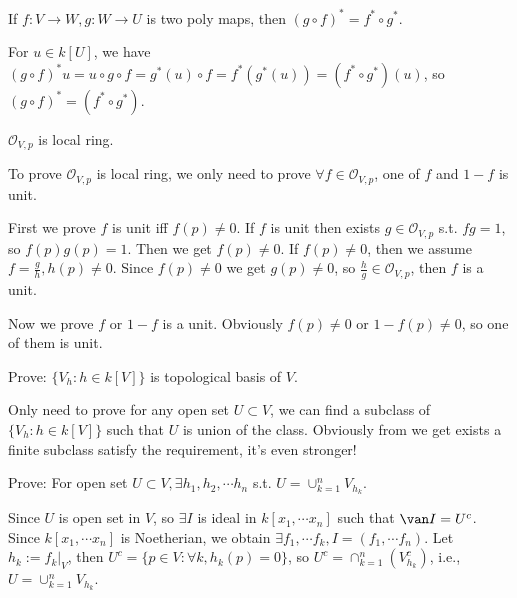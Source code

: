 \documentclass{ctexart}
\newif\ifpreface
\begin{document}
\large
\setlength{\baselineskip}{1.2em}
\ifpreface
    
\newgeometry{left=2cm,right=2cm,top=2cm,bottom=2cm}
\else
{}
\maketitle
\fi
\begin{problem}
 If $f:V\to W,g:W\to U$ is two poly maps, then $(g\circ f)^*=f^*\circ g^*$. 
\end{problem}

\begin{solution}
 For $u\in k[U]$, we have $(g\circ f)^* u=u\circ g\circ f=g^*(u)\circ f=f^*(g^*(u))=(f^*\circ g^*)(u)$, so $(g\circ f)^*=(f^*\circ g^*)$. 
\end{solution}

\begin{problem}
 $\mathcal{O}_{V,p}$ is local ring. 
\end{problem}

\begin{solution}
 To prove $\mathcal{O}_{V,p}$ is local ring, we only need to prove $\forall f\in \mathcal{O}_{V,p}$, one of $f$ and $1-f$ is unit. 

 First we prove $f$ is unit iff $f(p)\neq 0$. If $f$ is unit then exists $g\in \mathcal{O}_{V,p}$ s.t. $fg=1$, so $f(p)g(p)=1$. Then we get $f(p)\neq 0$. If $f(p)\neq 0$, then we assume $f=\frac{g}{h},h(p)\neq 0$. Since $f(p)\neq 0$ we get $g(p)\neq 0$, so $\frac{h}{g}\in \mathcal{O}_{V,p}$, then $f$ is a unit. 

 Now we prove $f$ or $1-f$ is a unit. Obviously $f(p)\neq 0$ or $1-f(p)\neq 0$, so one of them is unit. 
\end{solution}

\begin{problem}
 Prove: $\{V_h:h\in k[V]\}$ is topological basis of $V$. 
\end{problem}

\begin{solution}
 Only need to prove for any open set $U\subset V$, we can find a subclass of $\{V_h:h\in k[V]\}$ such that $U$ is union of the class. Obviously from  we get exists a finite subclass satisfy the requirement, it's even stronger! 
\end{solution}

\begin{problem}\label{pro:5}
 Prove: For open set $U\subset V,\exists h_1,h_2,\cdots h_n$ s.t. $U=\cup_{k=1}^n V_{h_k}$. 
\end{problem}

\begin{solution}
 Since $U$ is open set in $V$, so $\exists I$ is ideal in $k[x_1,\cdots x_n]$ such that $\van I=U^c$. Since $k[x_1,\cdots x_n]$ is Noetherian, we obtain $\exists f_1,\cdots f_k,I=(f_1,\cdots f_n)$. Let $h_k:=f_k|_V$, then $U^c=\{p\in V:\forall k,h_k(p)=0\}$, so $U^c=\cap_{k=1}^n (V_{h_k}^c)$, i.e., $U=\cup_{k=1}^n V_{h_k}$. 
\end{solution}
\end{document}
